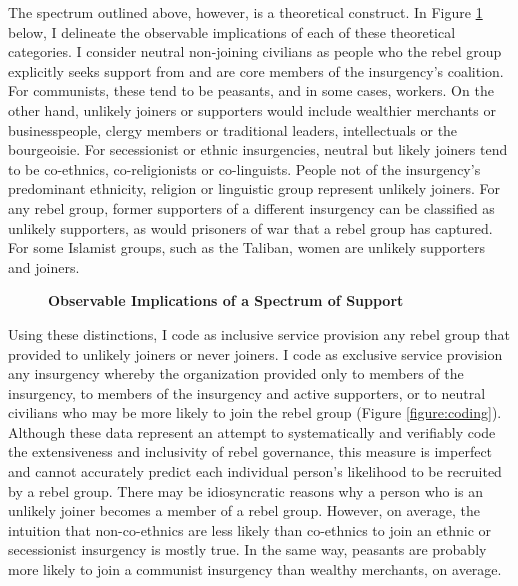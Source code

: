 \documentclass[12pt, letterpaper]{article}
\begin{document}
The spectrum outlined above, however, is a theoretical construct. In Figure \ref{figure:spectrumspecific}  below, I delineate the observable implications of each of these theoretical categories. I consider neutral non-joining civilians as people who the rebel group explicitly seeks support from and are core members of the insurgency's coalition. For communists, these tend to be peasants, and in some cases, workers. On the other hand, unlikely joiners or supporters would include wealthier merchants or businesspeople, clergy members or traditional leaders, intellectuals or the bourgeoisie. For secessionist or ethnic insurgencies, neutral but likely joiners tend to be co-ethnics, co-religionists or co-linguists. People not of the insurgency's predominant ethnicity, religion or linguistic group represent unlikely joiners. For any rebel group, former supporters of a different insurgency can be classified as unlikely supporters, as would prisoners of war that a rebel group has captured. For some Islamist groups, such as the Taliban, women are unlikely supporters and joiners. 

\begin{figure}[h!]
\centering
\begin{center}
\renewcommand\thefigure{A.\arabic{figure}}
\caption{\textbf{Observable Implications of a Spectrum of Support}}
\label{figure:spectrumspecific}
\end{center}
\end{figure}

Using these distinctions, I code as inclusive service provision any rebel group that provided to unlikely joiners or never joiners. I code as exclusive service provision any insurgency whereby the organization provided only to members of the insurgency, to members of the insurgency and active supporters, or to neutral civilians who may be more likely to join the rebel group (Figure \ref{figure:coding}). Although these data represent an attempt to systematically and verifiably code the extensiveness and inclusivity of rebel governance, this measure is imperfect and cannot accurately predict each individual person's likelihood to be recruited by a rebel group. There may be idiosyncratic reasons why a person who is an unlikely joiner becomes a member of a rebel group. However, on average, the intuition that non-co-ethnics are less likely than co-ethnics to join an ethnic or secessionist insurgency is mostly true. In the same way, peasants are probably more likely to join a communist insurgency than wealthy merchants, on average.
\end{document}
